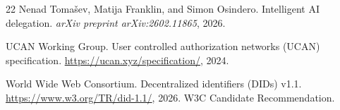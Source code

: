 \documentclass[11pt,a4paper]{article}
\begin{document}
\begin{thebibliography}{22}
Nenad Toma{\v{s}}ev, Matija Franklin, and Simon Osindero.
\newblock Intelligent {AI} delegation.
\newblock \emph{arXiv preprint arXiv:2602.11865}, 2026.

{UCAN Working Group}.
\newblock User controlled authorization networks ({UCAN}) specification.
\newblock \url{https://ucan.xyz/specification/}, 2024.

{World Wide Web Consortium}.
\newblock Decentralized identifiers ({DIDs}) v1.1.
\newblock \url{https://www.w3.org/TR/did-1.1/}, 2026.
\newblock W3C Candidate Recommendation.

\end{thebibliography}
\end{document}
